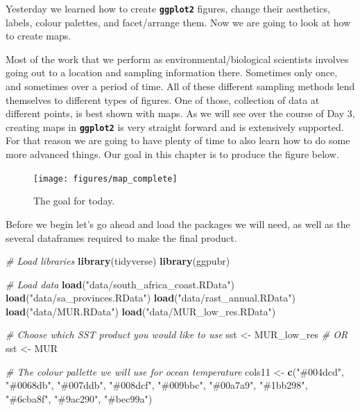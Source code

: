 \documentclass[
]{book}
\newenvironment{Shaded}{\begin{snugshade}}{\end{snugshade}}
\newcommand{\CommentTok}[1]{\textcolor[rgb]{0.56,0.35,0.01}{\textit{#1}}}
\newcommand{\KeywordTok}[1]{\textcolor[rgb]{0.13,0.29,0.53}{\textbf{#1}}}
\newcommand{\NormalTok}[1]{#1}
\newcommand{\StringTok}[1]{\textcolor[rgb]{0.31,0.60,0.02}{#1}}
\begin{document}
Yesterday we learned how to create \textbf{\texttt{ggplot2}} figures, change their aesthetics, labels, colour palettes, and facet/arrange them. Now we are going to look at how to create maps.

Most of the work that we perform as environmental/biological scientists involves going out to a location and sampling information there. Sometimes only once, and sometimes over a period of time. All of these different sampling methods lend themselves to different types of figures. One of those, collection of data at different points, is best shown with maps. As we will see over the course of Day 3, creating maps in \textbf{\texttt{ggplot2}} is very straight forward and is extensively supported. For that reason we are going to have plenty of time to also learn how to do some more advanced things. Our goal in this chapter is to produce the figure below.

\begin{figure}

{\centering \texttt{[image: figures/map\_complete]} 

}

\caption{The goal for today.}\label{fig:map-goal}
\end{figure}

Before we begin let's go ahead and load the packages we will need, as well as the several dataframes required to make the final product.

\begin{Shaded}
\begin{Highlighting}[]
\CommentTok{\# Load libraries}
\KeywordTok{library}\NormalTok{(tidyverse)}
\KeywordTok{library}\NormalTok{(ggpubr)}

\CommentTok{\# Load data}
\KeywordTok{load}\NormalTok{(}\StringTok{"data/south\_africa\_coast.RData"}\NormalTok{)}
\KeywordTok{load}\NormalTok{(}\StringTok{"data/sa\_provinces.RData"}\NormalTok{)}
\KeywordTok{load}\NormalTok{(}\StringTok{"data/rast\_annual.RData"}\NormalTok{)}
\KeywordTok{load}\NormalTok{(}\StringTok{"data/MUR.RData"}\NormalTok{)}
\KeywordTok{load}\NormalTok{(}\StringTok{"data/MUR\_low\_res.RData"}\NormalTok{)}

\CommentTok{\# Choose which SST product you would like to use}
\NormalTok{sst <{-}}\StringTok{ }\NormalTok{MUR\_low\_res}
\CommentTok{\# OR}
\NormalTok{sst <{-}}\StringTok{ }\NormalTok{MUR}

\CommentTok{\# The colour pallette we will use for ocean temperature}
\NormalTok{cols11 <{-}}\StringTok{ }\KeywordTok{c}\NormalTok{(}\StringTok{"\#004dcd"}\NormalTok{, }\StringTok{"\#0068db"}\NormalTok{, }\StringTok{"\#007ddb"}\NormalTok{, }\StringTok{"\#008dcf"}\NormalTok{, }\StringTok{"\#009bbc"}\NormalTok{,}
            \StringTok{"\#00a7a9"}\NormalTok{, }\StringTok{"\#1bb298"}\NormalTok{, }\StringTok{"\#6cba8f"}\NormalTok{, }\StringTok{"\#9ac290"}\NormalTok{, }\StringTok{"\#bec99a"}\NormalTok{)}
\end{Highlighting}
\end{Shaded}
\end{document}
